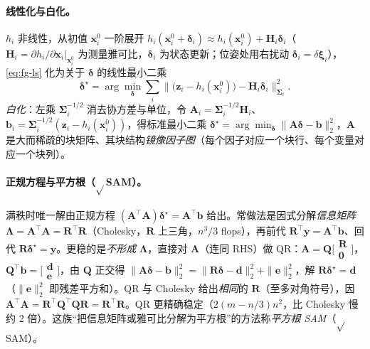 \paragraph{线性化与白化。}
$h_i$ 非线性，从初值 $\mathbf{x}_i^0$ 一阶展开 $h_i(\mathbf{x}_i^0+\boldsymbol{\delta}_i)\approx h_i(\mathbf{x}_i^0)+\mathbf{H}_i\boldsymbol{\delta}_i$（$\mathbf{H}_i=\partial h_i/\partial\mathbf{x}_i|_{\mathbf{x}_i^0}$ 为测量雅可比，$\boldsymbol{\delta}_i$ 为状态更新；位姿处用右扰动 $\boldsymbol{\delta}_i=\delta\boldsymbol{\xi}_i$），\cref{eq:fg-ls} 化为关于 $\boldsymbol{\delta}$ 的线性最小二乘
\begin{equation}
  \boldsymbol{\delta}^\star=\arg\min_{\boldsymbol{\delta}}\sum_i\big\|\big(\mathbf{z}_i-h_i(\mathbf{x}_i^0)\big)-\mathbf{H}_i\boldsymbol{\delta}_i\big\|_{\boldsymbol{\Sigma}_i}^2.
  \label{eq:fg-linearized}
\end{equation}
\emph{白化}：左乘 $\boldsymbol{\Sigma}_i^{-1/2}$ 消去协方差与单位\cite{carlone2026handbook}，令 $\mathbf{A}_i=\boldsymbol{\Sigma}_i^{-1/2}\mathbf{H}_i$、$\mathbf{b}_i=\boldsymbol{\Sigma}_i^{-1/2}(\mathbf{z}_i-h_i(\mathbf{x}_i^0))$，得标准最小二乘 $\boldsymbol{\delta}^\star=\arg\min_{\boldsymbol{\delta}}\|\mathbf{A}\boldsymbol{\delta}-\mathbf{b}\|_2^2$，$\mathbf{A}$ 是大而稀疏的块矩阵、其块结构\emph{镜像因子图}（每个因子对应一个块行、每个变量对应一个块列）。

\paragraph{正规方程与平方根（$\sqrt{}$SAM）。}
满秩时唯一解由正规方程 $(\mathbf{A}^\top\mathbf{A})\boldsymbol{\delta}^\star=\mathbf{A}^\top\mathbf{b}$ 给出。常做法是因式分解\emph{信息矩阵} $\boldsymbol{\Lambda}=\mathbf{A}^\top\mathbf{A}=\mathbf{R}^\top\mathbf{R}$（Cholesky，$\mathbf{R}$ 上三角，$n^3/3$ flops），再前代 $\mathbf{R}^\top\mathbf{y}=\mathbf{A}^\top\mathbf{b}$、回代 $\mathbf{R}\boldsymbol{\delta}^\star=\mathbf{y}$\cite{carlone2026handbook}。更稳的是\emph{不形成} $\boldsymbol{\Lambda}$，直接对 $\mathbf{A}$（连同 RHS）做 QR：$\mathbf{A}=\mathbf{Q}\big[\begin{smallmatrix}\mathbf{R}\\\mathbf{0}\end{smallmatrix}\big]$，$\mathbf{Q}^\top\mathbf{b}=\big[\begin{smallmatrix}\mathbf{d}\\\mathbf{e}\end{smallmatrix}\big]$，由 $\mathbf{Q}$ 正交得 $\|\mathbf{A}\boldsymbol{\delta}-\mathbf{b}\|_2^2=\|\mathbf{R}\boldsymbol{\delta}-\mathbf{d}\|_2^2+\|\mathbf{e}\|_2^2$，解 $\mathbf{R}\boldsymbol{\delta}^\star=\mathbf{d}$（$\|\mathbf{e}\|_2^2$ 即残差平方和）。QR 与 Cholesky 给出\emph{相同}的 $\mathbf{R}$（至多对角符号），因 $\mathbf{A}^\top\mathbf{A}=\mathbf{R}^\top\mathbf{Q}^\top\mathbf{Q}\mathbf{R}=\mathbf{R}^\top\mathbf{R}$。QR 更精确稳定（$2(m-n/3)n^2$，比 Cholesky 慢约 2 倍）。这族“把信息矩阵或雅可比分解为平方根”的方法称\emph{平方根 SAM}（$\sqrt{}$SAM）\cite{dellaert2017factor}。

